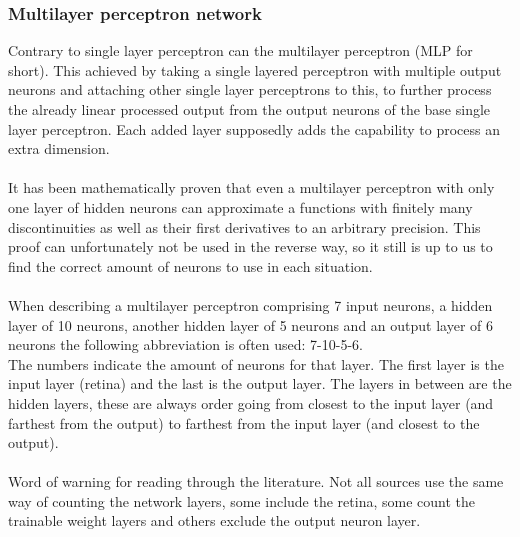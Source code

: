 \documentclass[pdftex,a4paper,12pt,twoside]{report}
\theoremstyle{plain} \newtheorem{theorem}{Theorem} \newtheorem{proposition}{Proposition} \newtheorem{lemma}{Lemma} \newtheorem*{corollary}{Corollary}
\theoremstyle{definition} \newtheorem{definition}{Definition} \newtheorem{conjecture}{Conjecture} \newtheorem*{example}{Example} \newtheorem{algorithm}{Algorithm}
\theoremstyle{remark} \newtheorem*{remark}{Remark} \newtheorem*{note}{Note} \newtheorem{case}{Case}
\begin{document}
\subsubsection{Multilayer perceptron network}
Contrary to single layer perceptron can the multilayer perceptron (MLP for short). This achieved by taking a single layered perceptron with multiple output neurons and attaching other single layer perceptrons to this, to further process the already linear processed output from the output neurons of the base single layer perceptron. Each added layer supposedly adds the capability to process an extra dimension.\\\\It has been mathematically proven that even a multilayer perceptron with only one layer of hidden neurons can approximate a functions with finitely many discontinuities as well as their first derivatives to an arbitrary precision. This proof can unfortunately not be used in the reverse way, so it still is up to us to find the correct amount of neurons to use in each situation.\\\\When describing a multilayer perceptron comprising 7 input neurons, a hidden layer of 10 neurons, another hidden layer of 5 neurons and an output layer of 6 neurons the following abbreviation is often used: 7-10-5-6.\\The numbers indicate the amount of neurons for that layer. The first layer is the input layer (retina) and the last is the output layer. The layers in between are the hidden layers, these are always order going from closest to the input layer (and farthest from the output) to farthest from the input layer (and closest to the output).\\\\Word of warning for reading through the literature. Not all sources use the same way of counting the network layers, some include the retina, some count the trainable weight layers and others exclude the output neuron layer.
\end{document}
